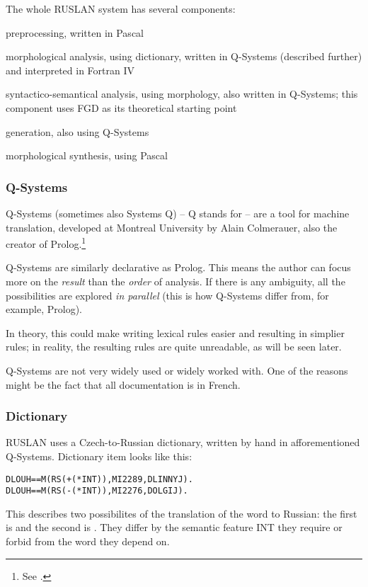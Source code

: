 The whole RUSLAN system has several components:
\begin{pitemize}
\item preprocessing, written in Pascal
\item morphological analysis, using dictionary, written in Q-Systems (described further) and interpreted in Fortran IV
\item syntactico-semantical analysis, using morphology, also written in Q-Systems; this component uses FGD as its theoretical starting point
\item generation, also using Q-Systems
\item morphological synthesis, using Pascal
\end{pitemize}

\subsubsection{Q-Systems}
Q-Systems (sometimes also Systems Q) -- Q stands for  -- are a tool for machine translation, developed at Montreal University by Alain Colmerauer, also the creator of Prolog.\footnote{See \cite{qsystems}.} 

Q-Systems are similarly declarative as Prolog. This means the author can focus more on the \emph{result} than the \emph{order} of analysis. If there is any ambiguity, all the possibilities are explored \emph{in parallel} (this is how Q-Systems differ from, for example, Prolog). 

In theory, this could make writing lexical rules easier and resulting in simplier rules; in reality, the resulting rules are quite unreadable, as will be seen later.

Q-Systems are not very widely used or widely worked with. One of the reasons might be the fact that all documentation is in French.  


\subsubsection{Dictionary}
RUSLAN uses a Czech-to-Russian dictionary, written by hand in afforementioned Q-Systems. Dictionary item looks like this:

\begin{verbatim}
DLOUH==M(RS(+(*INT)),MI2289,DLINNYJ).
DLOUH==M(RS(-(*INT)),MI2276,DOLGIJ).
\end{verbatim}

This describes two possibilites of the translation of the word  to Russian: the first is  and the second is . They differ by the semantic feature INT they require or forbid from the word they depend on. 

